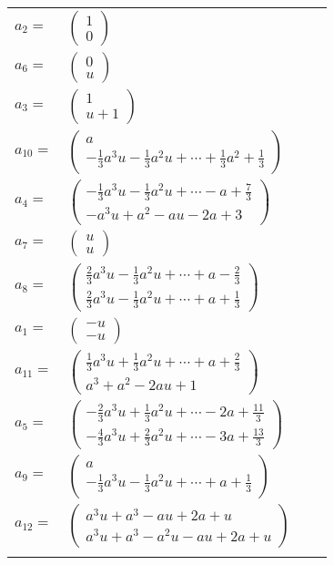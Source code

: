 \documentclass[1p]{elsarticle_modified}
\theoremstyle{definition}
\begin{document}
\begin{tabular}{m{7pt} m{180pt} m{7pt} m{180pt} }
\flushright $a_{2}=$&$\begin{pmatrix}1\\0\end{pmatrix}$ \\
\flushright $a_{6}=$&$\begin{pmatrix}0\\u\end{pmatrix}$ \\
\flushright $a_{3}=$&$\begin{pmatrix}1\\u+1\end{pmatrix}$ \\
\flushright $a_{10}=$&$\begin{pmatrix}a\\-\frac{1}{3} a^3 u-\frac{1}{3} a^2 u+\cdots+\frac{1}{3} a^2+\frac{1}{3}\end{pmatrix}$ \\
\flushright $a_{4}=$&$\begin{pmatrix}-\frac{1}{3} a^3 u-\frac{1}{3} a^2 u+\cdots- a+\frac{7}{3}\\- a^3 u+a^2- a u-2 a+3\end{pmatrix}$ \\
\flushright $a_{7}=$&$\begin{pmatrix}u\\u\end{pmatrix}$ \\
\flushright $a_{8}=$&$\begin{pmatrix}\frac{2}{3} a^3 u-\frac{1}{3} a^2 u+\cdots+a-\frac{2}{3}\\\frac{2}{3} a^3 u-\frac{1}{3} a^2 u+\cdots+a+\frac{1}{3}\end{pmatrix}$ \\
\flushright $a_{1}=$&$\begin{pmatrix}- u\\- u\end{pmatrix}$ \\
\flushright $a_{11}=$&$\begin{pmatrix}\frac{1}{3} a^3 u+\frac{1}{3} a^2 u+\cdots+a+\frac{2}{3}\\a^3+a^2-2 a u+1\end{pmatrix}$ \\
\flushright $a_{5}=$&$\begin{pmatrix}-\frac{2}{3} a^3 u+\frac{1}{3} a^2 u+\cdots-2 a+\frac{11}{3}\\-\frac{4}{3} a^3 u+\frac{2}{3} a^2 u+\cdots-3 a+\frac{13}{3}\end{pmatrix}$ \\
\flushright $a_{9}=$&$\begin{pmatrix}a\\-\frac{1}{3} a^3 u-\frac{1}{3} a^2 u+\cdots+a+\frac{1}{3}\end{pmatrix}$ \\
\flushright $a_{12}=$&$\begin{pmatrix}a^3 u+a^3- a u+2 a+u\\a^3 u+a^3- a^2 u- a u+2 a+u\end{pmatrix}$\\&\end{tabular}
\end{document}

